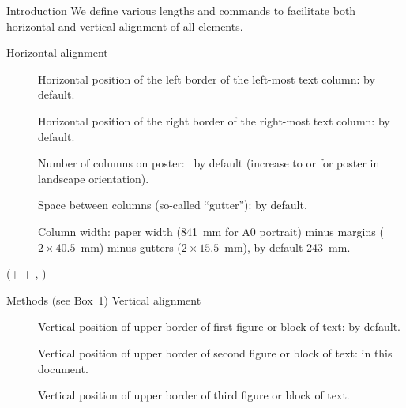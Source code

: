 \documentclass{beamer}
\newlength{\blockOne}
\newlength{\blockTwo}
\newlength{\blockThree}
\begin{document}
\begin{frame}[t]
\begin{textblock*}{\colwidth}
\begin{parblock}{Introduction}
	\vspace{0.333333\baselineskip}
	\noindent We define various lengths and commands to facilitate both horizontal and vertical alignment of all elements.

	\vspace{0.666667\baselineskip}
	\noindent\alert{Horizontal alignment}

	\begin{description}
		\item[] Horizontal position of the left border of the left-most text column: \code{40.5mm} by default.
		\item[] Horizontal position of the right border of the right-most text column: \code{40.5mm} by default.
		\item[] Number of columns on poster: ~by default (increase to  or  for poster in landscape orientation).
		\item[] Space between columns (so-called ``gutter''): \code{15.5mm} by default.
		\item[] Column width: paper width (841~mm for A0 portrait) minus margins (${2 \times 40.5}$~mm) minus gutters (${2 \times 15.5}$~mm), by default 243~mm.
	\end{description}
\end{parblock}

\end{textblock*}




\begin{textblock*}{\colwidth}(\leftmargin + \colwidth + \colsep, \blockThree)

\begin{parblock}{Methods {\mdseries(see Box~1)}}
\alert{Vertical alignment} %
	\begin{description}
		\item[] Vertical position of upper border of first figure or block of text: \code{19.50cm} by default.
		\item[] Vertical position of upper border of second figure or block of text: \code{48.25cm} in this document.
		\item[] Vertical position of upper border of third figure or block of text.
	\end{description}


\end{parblock}
\end{textblock*}
\end{frame}
\end{document}
